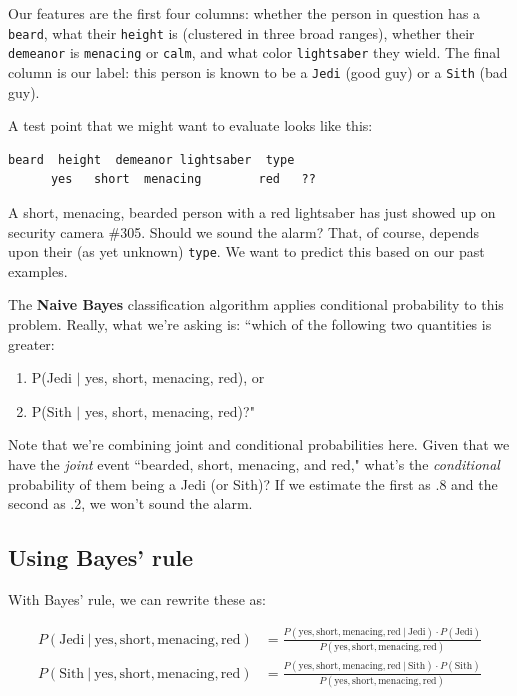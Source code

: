 \documentclass[12pt]{article}
\begin{document}
Our features are the first four columns: whether the person in question has a
\texttt{beard}, what their \texttt{height} is (clustered in three broad
ranges), whether their \texttt{demeanor} is \texttt{menacing} or
\texttt{calm}, and what color \texttt{lightsaber} they wield. The final
column is our label: this person is known to be a \texttt{Jedi} (good guy) or
a \texttt{Sith} (bad guy).

A test point that we might want to evaluate looks like this:
\begin{Verbatim}[fontsize=\small,samepage=true,frame=none]
    beard  height  demeanor lightsaber  type
      yes   short  menacing        red   ?? 
\end{Verbatim}

A short, menacing, bearded person with a red lightsaber has just showed up on
security camera \#305. Should we sound the alarm? That, of course, depends
upon their (as yet unknown) \texttt{type}. We want to predict this based on
our past examples.

The \textbf{Naive Bayes} classification algorithm applies conditional
probability to this problem. Really, what we're asking is: ``which of
the following two quantities is greater:

\begin{enumerate}
\itemsep.05em
\item P(Jedi $|$ yes, short, menacing, red),  or
\item P(Sith $|$ yes, short, menacing, red)?"
\end{enumerate}
 
Note that we're combining joint and conditional probabilities here. Given that
we have the \textit{joint} event ``bearded, short, menacing, and red," what's
the \textit{conditional} probability of them being a Jedi (or Sith)? If we
estimate the first as .8 and the second as .2, we won't sound the alarm.

\subsection{Using Bayes' rule}

With Bayes' rule, we can rewrite these as:

\vspace{-.2in}
\begin{align}
P(\textrm{Jedi} \ | \ \textrm{yes}, \textrm{short}, \textrm{menacing},
\textrm{red}) &=
\frac{P(\textrm{yes}, \textrm{short}, \textrm{menacing}, \textrm{red} \ | \ 
\textrm{Jedi}) \cdot P(\textrm{Jedi})}{P(\textrm{yes}, \textrm{short},
\textrm{menacing},
\textrm{red})} \label{eqn:jedi} \\
P(\textrm{Sith} \ | \ \textrm{yes}, \textrm{short}, \textrm{menacing},
\textrm{red}) &=
\frac{P(\textrm{yes}, \textrm{short}, \textrm{menacing}, \textrm{red} \ | \ 
\textrm{Sith}) \cdot P(\textrm{Sith})}{P(\textrm{yes}, \textrm{short},
\textrm{menacing},
\textrm{red})}  \label{eqn:sith}
\end{align}
\end{document}
